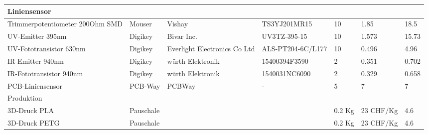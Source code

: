 \documentclass[main.tex]{subfiles} %
\begin{document}
\begin{table}[h]
{\begin{tabular}{|p{3cm}|p{2.5cm}|p{2.5cm}|p{3cm}|p{1cm}|p{1.5cm}|p{1cm}|}
            \rowcolor{lightgray} Liniensensor &                    &                              &                         &                 &                           &                             \\ \hline
            Trimmerpotentiometer 200Ohm SMD   & Mouser             & Vishay                       & TS3YJ201MR15            & 10              & 1.85                      & 18.5                        \\ \hline
            UV-Emitter 395nm                  & Digikey            & Bivar Inc.                   & UV3TZ-395-15            & 10              & 1.573                     & 15.73                       \\ \hline
            UV-Fototransistor 630nm           & Digikey            & Everlight Electronics Co Ltd & ALS-PT204-6C/L177       & 10              & 0.496                     & 4.96                        \\ \hline
            IR-Emitter 940nm                  & Digikey            & würth Elektronik             & 15400394F3590           & 2               & 0.351                     & 0.702                       \\ \hline
            IR-Fototransistor 940nm           & Digikey            & würth Elektronik             & 1540031NC6090           & 2               & 0.329                     & 0.658                       \\ \hline
            PCB-Liniensensor                  & PCB-Way            & PCBWay                       & -                       & 5               & 7                         & 7                           \\ \hline
            \rowcolor{lightgray} Produktion   &                    &                              &                         &                 &                           &                             \\ \hline
            3D-Druck PLA                      & Pauschale          &                              &                         & 0.2 Kg          & 23 CHF/Kg                 & 4.6                         \\ \hline
            3D-Druck PETG                     & Pauschale          &                              &                         & 0.2 Kg          & 23 CHF/Kg                 & 4.6                         \\ \hline


\end{tabular}}
\end{table}
\end{document}
